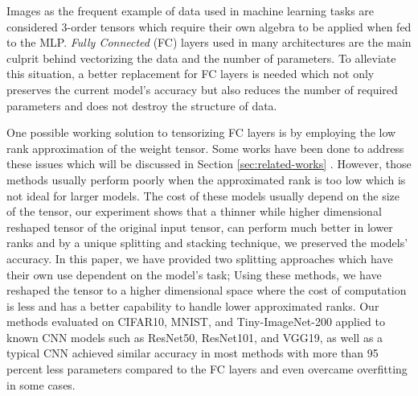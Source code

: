 \documentclass{article}
\begin{document}
Images as the frequent example of data used in  machine learning tasks are considered 3-order tensors which require their own algebra to be applied when fed to the MLP. \textit{Fully Connected} (FC) layers used in many architectures are the main culprit behind vectorizing the data and the number of parameters. To alleviate this situation, a better replacement for FC layers is needed which not only preserves the current model's accuracy but also reduces the number of required parameters and does not destroy the structure of data. 

One possible working solution to tensorizing FC layers is by employing the low rank approximation of the weight tensor. 
Some works have been done to address these issues which will be discussed in Section 
\ref{sec:related-works}
.
However, those methods usually perform poorly when the approximated rank is too low which is not ideal for larger models. The cost of these models usually depend on the size of the tensor, our experiment shows that a thinner while higher dimensional reshaped tensor of the original input tensor, can perform much better in lower ranks and by a unique splitting and stacking technique, we preserved the models' accuracy. In this paper, we have provided two splitting approaches which have their own use dependent on the model's task; Using these methods, we have reshaped the tensor to a higher dimensional space where the cost of computation is less and has a better capability to handle lower approximated ranks. Our methods evaluated on CIFAR10, MNIST, and Tiny-ImageNet-200 applied to known CNN models such as ResNet50, ResNet101, and VGG19, as well as a typical CNN achieved similar accuracy in most methods with more than 95 percent less parameters compared to the FC layers and even overcame overfitting in some cases. 
\end{document}
